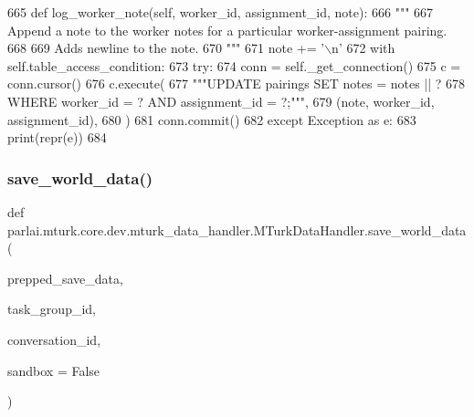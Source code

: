\begin{DoxyCode}
665     \textcolor{keyword}{def }log\_worker\_note(self, worker\_id, assignment\_id, note):
666         \textcolor{stringliteral}{"""}
667 \textcolor{stringliteral}{        Append a note to the worker notes for a particular worker-assignment pairing.}
668 \textcolor{stringliteral}{}
669 \textcolor{stringliteral}{        Adds newline to the note.}
670 \textcolor{stringliteral}{        """}
671         note += \textcolor{stringliteral}{'\(\backslash\)n'}
672         with self.table\_access\_condition:
673             \textcolor{keywordflow}{try}:
674                 conn = self.\_get\_connection()
675                 c = conn.cursor()
676                 c.execute(
677                     \textcolor{stringliteral}{"""UPDATE pairings SET notes = notes || ?}
678 \textcolor{stringliteral}{                             WHERE worker\_id = ? AND assignment\_id = ?;"""},
679                     (note, worker\_id, assignment\_id),
680                 )
681                 conn.commit()
682             \textcolor{keywordflow}{except} Exception \textcolor{keyword}{as} e:
683                 print(repr(e))
684 
\end{DoxyCode}
\mbox{\label{classparlai_1_1mturk_1_1core_1_1dev_1_1mturk__data__handler_1_1MTurkDataHandler_a6d5a47cdeede36a2fb650f28dd72ef12}} 
\subsubsection{\texorpdfstring{save\+\_\+world\+\_\+data()}{save\_world\_data()}}
{\footnotesize\ttfamily def parlai.\+mturk.\+core.\+dev.\+mturk\+\_\+data\+\_\+handler.\+M\+Turk\+Data\+Handler.\+save\+\_\+world\+\_\+data (\begin{DoxyParamCaption}\item[{}]{prepped\+\_\+save\+\_\+data,  }\item[{}]{task\+\_\+group\+\_\+id,  }\item[{}]{conversation\+\_\+id,  }\item[{}]{sandbox = {\ttfamily False} }\end{DoxyParamCaption})\hspace{0.3cm}{\ttfamily [static]}}



